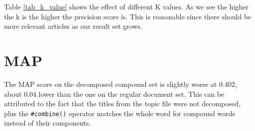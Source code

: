 \documentclass[11pt]{article} %
\begin{document}
Table \ref{tab_k_value} shows the effect of different K values. As we see the higher the k is the higher the precision score is. This is reasonable since there should be more relevant articles as our result set grows.

\section{MAP}
The MAP score on the decomposed compound set is slightly worse at 0.402, about 0.04 lower than the one on the regular document set. This can be attributed to the fact that the titles from the topic file were not decomposed, plus the \verb|#combine()| operator matches the whole word for compound words instead of their components.
\end{document}
